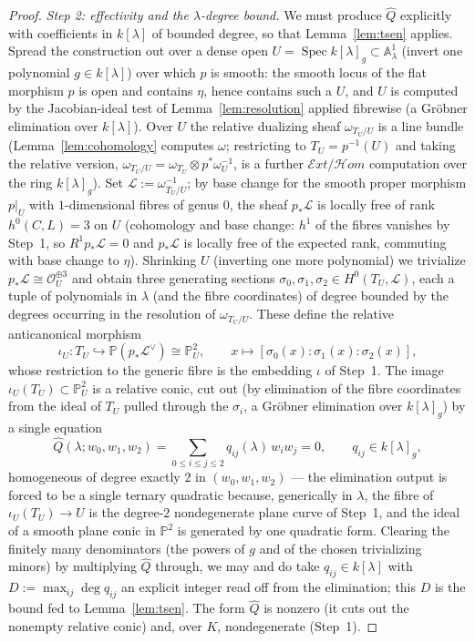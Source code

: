 \documentclass{amsart}
\theoremstyle{plain}
\theoremstyle{definition}
\newcommand{\PP}{\mathbb{P}}
\newcommand{\AA}{\mathbb{A}}
\newcommand{\cO}{\mathcal{O}}
\DeclareMathOperator{\Spec}{Spec}
\begin{document}
\begin{proof}
\smallskip
\emph{Step 2: effectivity and the $\lambda$-degree bound.}
We must produce $\widehat Q$ explicitly with coefficients in $k[\lambda]$ of
bounded degree, so that Lemma~\ref{lem:tsen} applies.  Spread the construction
out over a dense open $U=\Spec k[\lambda]_g\subset\AA^1_\lambda$ (invert one
polynomial $g\in k[\lambda]$) over which $p$ is smooth: the smooth locus of the
flat morphism $p$ is open and contains $\eta$, hence contains such a $U$, and $U$
is computed by the Jacobian-ideal test of Lemma~\ref{lem:resolution} applied
fibrewise (a Gr\"obner elimination over $k[\lambda]$).  Over $U$ the relative
dualizing sheaf $\omega_{T_U/U}$ is a line bundle (Lemma~\ref{lem:cohomology}
computes $\omega$; restricting to $T_U=p^{-1}(U)$ and taking the relative
version, $\omega_{T_U/U}=\omega_{T_U}\otimes p^*\omega_U^{-1}$, is a further
$\mathcal Ext/\mathcal Hom$ computation over the ring $k[\lambda]_g$).  Set
$\mathcal L:=\omega_{T_U/U}^{-1}$; by base change for the smooth proper morphism
$p|_U$ with $1$-dimensional fibres of genus $0$, the sheaf
$p_*\mathcal L$ is locally free of rank $h^0(C,L)=3$ on $U$ (cohomology and base
change: $h^1$ of the fibres vanishes by Step~1, so $R^1p_*\mathcal L=0$ and
$p_*\mathcal L$ is locally free of the expected rank, commuting with base change
to $\eta$).  Shrinking $U$ (inverting one more polynomial) we trivialize
$p_*\mathcal L\cong\cO_U^{\oplus3}$ and obtain three generating sections
$\sigma_0,\sigma_1,\sigma_2\in H^0(T_U,\mathcal L)$, each a tuple of polynomials
in $\lambda$ (and the fibre coordinates) of degree bounded by the degrees
occurring in the resolution of $\omega_{T_U/U}$.  These define the relative
anticanonical morphism
\[
\iota_U\colon T_U\hookrightarrow \PP(p_*\mathcal L^\vee)\cong\PP^2_U ,\qquad
x\mapsto[\sigma_0(x):\sigma_1(x):\sigma_2(x)],
\]
whose restriction to the generic fibre is the embedding $\iota$ of Step~1.  The
image $\iota_U(T_U)\subset\PP^2_U$ is a relative conic, cut out (by elimination
of the fibre coordinates from the ideal of $T_U$ pulled through the $\sigma_i$,
a Gr\"obner elimination over $k[\lambda]_g$) by a single equation
\[
\widehat Q(\lambda;w_0,w_1,w_2)=\sum_{0\le i\le j\le 2}q_{ij}(\lambda)\,w_iw_j=0 ,
\qquad q_{ij}\in k[\lambda]_g ,
\]
homogeneous of degree exactly $2$ in $(w_0,w_1,w_2)$ — the elimination output is
forced to be a single ternary quadratic because, generically in $\lambda$, the
fibre of $\iota_U(T_U)\to U$ is the degree-$2$ nondegenerate plane curve of
Step~1, and the ideal of a smooth plane conic in $\PP^2$ is generated by one
quadratic form.  Clearing the finitely many denominators (the powers of $g$ and
of the chosen trivializing minors) by multiplying $\widehat Q$ through, we may
and do take $q_{ij}\in k[\lambda]$ with $D:=\max_{ij}\deg q_{ij}$ an explicit
integer read off from the elimination; this $D$ is the bound fed to
Lemma~\ref{lem:tsen}.  The form $\widehat Q$ is nonzero (it cuts out the
nonempty relative conic) and, over $K$, nondegenerate (Step~1).


\end{proof}
\end{document}
